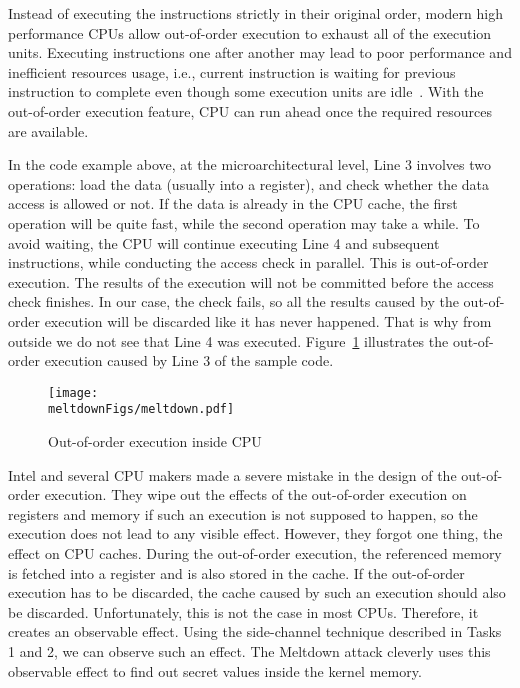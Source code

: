 Instead of executing the instructions strictly in their original order, modern high performance
CPUs allow out-of-order execution to exhaust all of the execution units. Executing instructions
one after another may lead to poor performance and inefficient resources usage, i.e., current
instruction is waiting for previous instruction to complete even though some execution units
are idle~\cite{wiki:outoforder}. With the out-of-order execution feature, CPU can 
run ahead once the required resources are available.


In the code example above, at the microarchitectural level, Line 3 involves two 
operations: load the data (usually into a register), and
check whether the data access is allowed or not. If the data is already in
the CPU cache, the first operation will be quite fast, while the second operation may take a
while. To avoid waiting, the CPU will continue executing Line 4 and subsequent instructions,
while conducting the access check in parallel. This is out-of-order execution. The results of
the execution will not be committed before the access check finishes. In our case,
the check fails, so all the results caused by the out-of-order execution will be discarded like
it has never happened.  That is why from outside we do not see that Line 4 was executed.  
Figure~\ref{meltdown:fig:outoforder} illustrates the out-of-order execution 
caused by Line 3 of the sample code. 



\begin{figure}[htb]
\centering
\texttt{[image: \\meltdownFigs/meltdown.pdf]}
\caption{Out-of-order execution inside CPU}
\label{meltdown:fig:outoforder}
\end{figure}


Intel and several CPU makers made a severe mistake in the design of the out-of-order execution. 
They wipe out the effects of the out-of-order execution on registers and memory
if such an execution is not supposed to happen, so the execution does not lead to 
any visible effect. However, they forgot one thing, the effect on CPU caches.  
During the out-of-order execution, the referenced memory is fetched into a register and is 
also stored in the cache. If the out-of-order execution has to be discarded, 
the cache caused by such an execution should also be discarded. Unfortunately, this is 
not the case in most CPUs. Therefore, it creates an observable effect. 
Using the side-channel technique described in Tasks 1 and 2, we 
can observe such an effect. The Meltdown attack cleverly uses this 
observable effect to find out secret values 
inside the kernel memory. 


